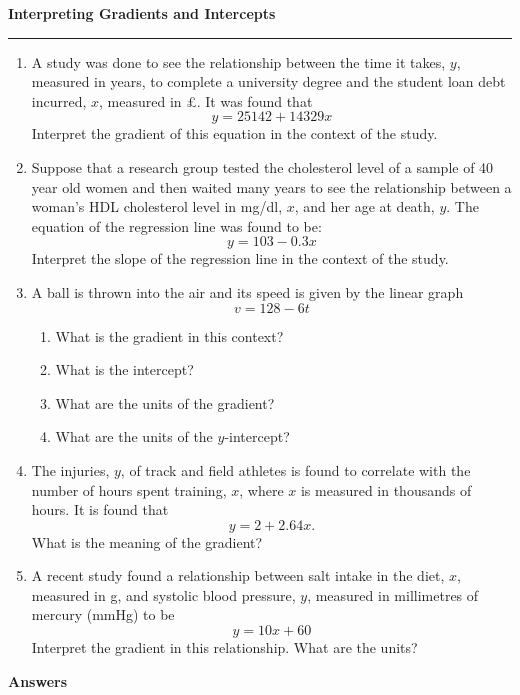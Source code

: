 \documentclass{article}
\begin{document}
\newpage

\noindent \textbf{Interpreting Gradients and Intercepts}

\medskip

\hrule

\medskip

\begin{enumerate}
    \item A study was done to see the relationship between the time it takes, \(y\), measured in years, to complete a university degree and the student loan debt incurred, \(x\), measured in £. It was found that
    \[y=25142+14329x\]
    Interpret the gradient of this equation in the context of the study.
    \item Suppose that a research group tested the cholesterol level of a sample of 40 year old women and then waited many years to see the relationship between a woman's HDL cholesterol level in mg/dl,  \(x\), and her age at death,  \(y\). The equation of the regression line was found to be:
    \[y=103 - 0.3x\]
    Interpret the slope of the regression line in the context of the study.
    \item A ball is thrown into the air and its speed is given by the linear graph
    \[v=128-6t\]
    \begin{enumerate}
        \item What is the gradient in this context?
        \item What is the intercept?
        \item What are the units of the gradient?
        \item What are the units of the \(y\)-intercept?
    \end{enumerate}
    \item The injuries, \(y\), of track and field athletes is found to correlate with the number of hours spent training, \(x\), where \(x\) is measured in thousands of hours. It is found that
    \[
    y = 2+2.64x.
    \]
    What is the meaning of the gradient?
    \item A recent study found a relationship between salt intake in the diet, \(x\), measured in g, and systolic blood pressure, \(y\), measured in millimetres of mercury (mmHg) to be
    \[y = 10x + 60\]
    Interpret the gradient in this relationship. What are the units?
\end{enumerate}


\newpage

\noindent \textbf{Answers}

\medskip
\end{document}
